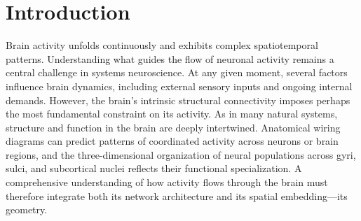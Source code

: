 \documentclass{article}
\begin{document}
\hrulefill
\vspace{10 pt}


\section*{Introduction}

Brain activity unfolds continuously and exhibits complex spatiotemporal patterns. Understanding what guides the flow of neuronal activity remains a central challenge in systems neuroscience. At any given moment, several factors influence brain dynamics, including external sensory inputs and ongoing internal demands\cite{flavell2022emergence}. However, the brain’s intrinsic structural connectivity imposes perhaps the most fundamental constraint on its activity\cite{suarez2020linking}. As in many natural systems, structure and function in the brain are deeply intertwined. Anatomical wiring diagrams can predict patterns of coordinated activity across neurons\cite{uzel2022set, randi2023neural, lappalainen2024connectome} or brain regions\cite{legare2024structural}, and the three-dimensional organization of neural populations across gyri, sulci, and subcortical nuclei reflects their functional specialization. A comprehensive understanding of how activity flows through the brain must therefore integrate both its network architecture and its spatial embedding---its geometry.
\end{document}
